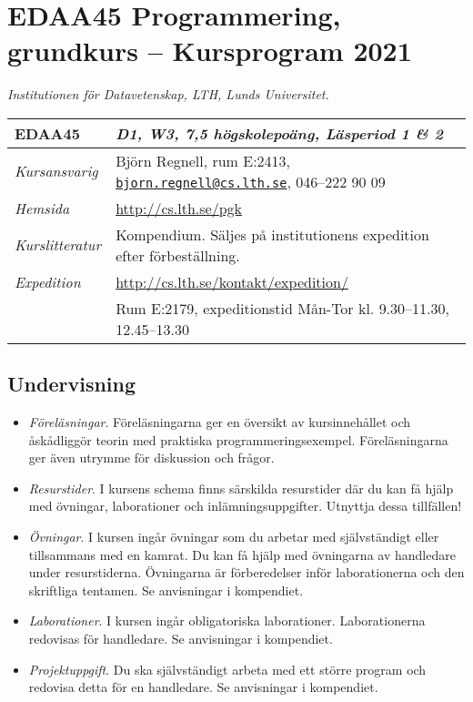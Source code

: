 \documentclass[a4paper,12pt,oneside]{memoir}
\newcommand{\YEAR}{2021}
\begin{document}
\section*{EDAA45 Programmering, grundkurs  -- Kursprogram \YEAR}
\emph{Institutionen för Datavetenskap, LTH, Lunds Universitet.}\\

\begin{longtable}[l]{ll}
\toprule
\textbf{EDAA45} & \textit {D1, W3, 7,5 högskolepoäng, Läsperiod 1 \& 2} \tabularnewline
\midrule
\endhead
\emph{Kursansvarig}   & Björn Regnell, rum E:2413,
                        \href{mailto:bjorn.regnell@cs.lth.se}
                        {\nolinkurl{bjorn.regnell@cs.lth.se}},
                        046--222 90 09\tabularnewline
\emph{Hemsida}        & \url{http://cs.lth.se/pgk}\tabularnewline
\emph{Kurslitteratur} & Kompendium. Säljes på institutionens expedition efter förbeställning.\tabularnewline
\emph{Expedition}     & \url{http://cs.lth.se/kontakt/expedition/}
                        \tabularnewline
                      & Rum E:2179, expeditionstid Mån-Tor kl. 9.30--11.30, 12.45--13.30\tabularnewline

\bottomrule
\end{longtable}

\subsection{Undervisning}\label{undervisning}

\begin{itemize}
\item
  \emph{Föreläsningar}. Föreläsningarna ger en översikt av
  kursinnehållet och åskådliggör teorin med praktiska
  programmeringsexempel. Föreläsningarna ger även utrymme för diskussion
  och frågor.
\item
  \emph{Resurstider}. I kursens schema finns särskilda resurstider
  där du kan få hjälp med övningar, laborationer och
  inlämningsuppgifter. Utnyttja dessa tillfällen!
\item
  \emph{Övningar}. I kursen ingår övningar som du arbetar med
  självständigt eller tillsammans med en kamrat.
  Du kan få hjälp med övningarna av handledare under resurstiderna.
  Övningarna är förberedelser inför laborationerna och den skriftliga tentamen.
  Se anvisningar i kompendiet.
\item
  \emph{Laborationer}. I kursen ingår obligatoriska laborationer.
  Laborationerna redovisas för handledare.
  Se anvisningar i kompendiet.
\item
  \emph{Projektuppgift}. Du ska självständigt arbeta med ett större
  program och redovisa detta för en handledare. Se anvisningar i
  kompendiet.
\end{itemize}
\end{document}
